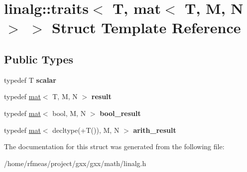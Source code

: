 \hypertarget{structlinalg_1_1traits_3_01T_00_01mat_3_01T_00_01M_00_01N_01_4_01_4}{}\section{linalg\+:\+:traits$<$ T, mat$<$ T, M, N $>$ $>$ Struct Template Reference}
\label{structlinalg_1_1traits_3_01T_00_01mat_3_01T_00_01M_00_01N_01_4_01_4}
\subsection*{Public Types}
\begin{DoxyCompactItemize}
\item 
typedef T {\bfseries scalar}\hypertarget{structlinalg_1_1traits_3_01T_00_01mat_3_01T_00_01M_00_01N_01_4_01_4_af57eaeb17c323a61a9899d78bb123e59}{}\label{structlinalg_1_1traits_3_01T_00_01mat_3_01T_00_01M_00_01N_01_4_01_4_af57eaeb17c323a61a9899d78bb123e59}

\item 
typedef \hyperlink{structlinalg_1_1mat}{mat}$<$ T, M, N $>$ {\bfseries result}\hypertarget{structlinalg_1_1traits_3_01T_00_01mat_3_01T_00_01M_00_01N_01_4_01_4_a58161375643171c2d63b8977a2b0dbba}{}\label{structlinalg_1_1traits_3_01T_00_01mat_3_01T_00_01M_00_01N_01_4_01_4_a58161375643171c2d63b8977a2b0dbba}

\item 
typedef \hyperlink{structlinalg_1_1mat}{mat}$<$ bool, M, N $>$ {\bfseries bool\+\_\+result}\hypertarget{structlinalg_1_1traits_3_01T_00_01mat_3_01T_00_01M_00_01N_01_4_01_4_adc2149d82c7547b4a48df465652901ee}{}\label{structlinalg_1_1traits_3_01T_00_01mat_3_01T_00_01M_00_01N_01_4_01_4_adc2149d82c7547b4a48df465652901ee}

\item 
typedef \hyperlink{structlinalg_1_1mat}{mat}$<$ decltype(+T()), M, N $>$ {\bfseries arith\+\_\+result}\hypertarget{structlinalg_1_1traits_3_01T_00_01mat_3_01T_00_01M_00_01N_01_4_01_4_aa52437f5c0f6ea17984a93e1a8e53bdf}{}\label{structlinalg_1_1traits_3_01T_00_01mat_3_01T_00_01M_00_01N_01_4_01_4_aa52437f5c0f6ea17984a93e1a8e53bdf}

\end{DoxyCompactItemize}


The documentation for this struct was generated from the following file\+:\begin{DoxyCompactItemize}
\item 
/home/rfmeas/project/gxx/gxx/math/linalg.\+h\end{DoxyCompactItemize}
